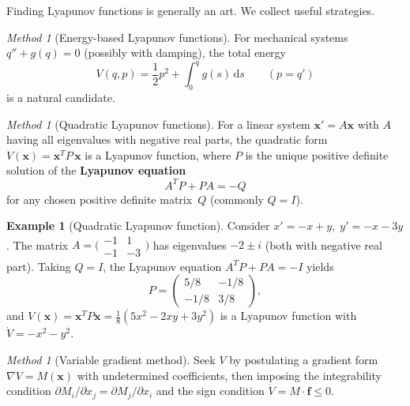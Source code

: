 \documentclass[12pt,a4paper,openany]{book}
\theoremstyle{definition}
\newtheorem{example}[definition]{Example}
\theoremstyle{plain}
\theoremstyle{remark}
\newtheorem{method}[definition]{Method}
\newcommand{\dd}{\mathrm{d}}
\begin{document}
Finding Lyapunov functions is generally an art. We collect useful strategies.

\begin{method}[Energy-based Lyapunov functions]
\label{meth:energy-lyapunov}
For mechanical systems \(q''+g(q)=0\) (possibly with damping), the total
energy
\[
  V(q,p) = \frac{1}{2}p^2 + \int_0^q g(s)\,\dd s
  \qquad (p=q')
\]
is a natural candidate.
\end{method}

\begin{method}[Quadratic Lyapunov functions]
\label{meth:quadratic-lyapunov}
For a linear system \(\mathbf{x}'=A\mathbf{x}\) with \(A\) having all
eigenvalues with negative real parts, the quadratic form
\(V(\mathbf{x})=\mathbf{x}^T P\,\mathbf{x}\) is a Lyapunov function, where
\(P\) is the unique positive definite solution of the \textbf{Lyapunov
equation}
\begin{equation}\label{eq:lyapunov-equation}
  A^T P + P A = -Q
\end{equation}
for any chosen positive definite matrix~\(Q\) (commonly \(Q=I\)).
\end{method}

\begin{example}[Quadratic Lyapunov function]
\label{ex:quadratic-lyapunov}
Consider \(x'=-x+y,\;y'=-x-3y\). The matrix \(A=\bigl(\begin{smallmatrix}
-1&1\\-1&-3\end{smallmatrix}\bigr)\) has eigenvalues \(-2\pm i\) (both with
negative real part). Taking \(Q=I\), the Lyapunov equation
\(A^TP+PA=-I\) yields
\[
  P = \begin{pmatrix} 5/8 & -1/8 \\ -1/8 & 3/8 \end{pmatrix},
\]
and \(V(\mathbf{x})=\mathbf{x}^TP\mathbf{x}=\frac{1}{8}(5x^2-2xy+3y^2)\) is a
Lyapunov function with \(\dot{V}=-x^2-y^2\).
\end{example}

\begin{method}[Variable gradient method]
\label{meth:variable-gradient}
Seek \(V\) by postulating a gradient form \(\nabla V = M(\mathbf{x})\) with
undetermined coefficients, then imposing the integrability condition
\(\partial M_i/\partial x_j=\partial M_j/\partial x_i\) and the sign
condition \(\dot{V}=M\cdot\mathbf{f}\le 0\).
\end{method}
\end{document}
